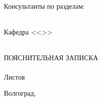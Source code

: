 {    Консультанты по разделам:\\
    \hfill
    \hfill
    \\
    \clearpage
    \renewcommand{\VSTUDocumentCodeSuffix}{81}
    \thispagestyle{empty}
    \begin{center}
    \VSTUTitleHeading
    Кафедра <<\VSTUDepartment>>\\
    \end{center}
    \vfill
    \hfill\VSTUTitleHeadApproval
    \vspace{8mm}
    \begin{center}
    \VSTUTitle\\
    \vspace{\fill}
    ПОЯСНИТЕЛЬНАЯ ЗАПИСКА\\
    \vspace{8mm}
    \VSTUDocumentCode\\
    \vspace{8mm}
    Листов \totalpages\\
    \vspace{\fill}
    \end{center}
    \begin{flushright}
    \VSTUTitleDirector
    \end{flushright}
    \vspace{8mm}
    \begin{flushleft}
    \VSTUTitleStandardsAdviser
    \hfill
    \VSTUTitleImplementer
    \end{flushleft}
    \vspace{\fill}
    \begin{center}
    Волгоград,~\the\year
    \end{center}
    \clearpage
}
